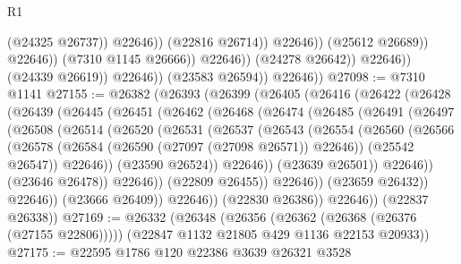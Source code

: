 \begin{lexlean}{R1}
\begin{coremodule}
                                              (@24325 @26737))
                                            @22646))
                                        (@22816 @26714))
                                      @22646))
                                  (@25612 @26689))
                                @22646))
                            (@7310 @1145 @26666))
                          @22646))
                      (@24278 @26642))
                    @22646))
                (@24339 @26619))
              @22646))
          (@23583 @26594))
        @22646))
@27098 := @7310 @1141
@27155 := @26382
    (@26393
      (@26399
        (@26405
          (@26416
            (@26422
              (@26428
                (@26439
                  (@26445
                    (@26451
                      (@26462
                        (@26468
                          (@26474
                            (@26485
                              (@26491
                                (@26497
                                  (@26508
                                    (@26514
                                      (@26520
                                        (@26531
                                          (@26537
                                            (@26543
                                              (@26554
                                                (@26560
                                                  (@26566
                                                    (@26578
                                                      (@26584
                                                        (@26590 (@27097 (@27098 @26571)) @22646))
                                                      (@25542 @26547))
                                                    @22646))
                                                (@23590 @26524))
                                              @22646))
                                          (@23639 @26501))
                                        @22646))
                                    (@23646 @26478))
                                  @22646))
                              (@22809 @26455))
                            @22646))
                        (@23659 @26432))
                      @22646))
                  (@23666 @26409))
                @22646))
            (@22830 @26386))
          @22646))
      (@22837 @26338))
@27169 := @26332
    (@26348
      (@26356 (@26362 (@26368 (@26376 (@27155 @22806)))))
      (@22847 @1132 @21805 @429 @1136 @22153 @20933))
@27175 := @22595 @1786 @120 @22386 @3639 @26321 @3528

\end{coremodule}
\end{lexlean}
